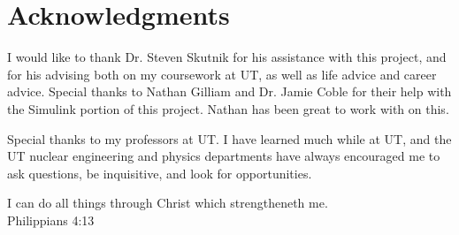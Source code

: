 \chapter*{Acknowledgments}
I would like to thank Dr. Steven Skutnik for his assistance with this project, and for his advising both on my coursework at UT, as well as life advice and career advice. Special thanks to Nathan Gilliam and Dr. Jamie Coble for their help with the Simulink portion of this project. Nathan has been great to work with on this. 

Special thanks to my professors at UT. I have learned much while at UT, and the UT nuclear engineering and physics departments have always encouraged me to ask questions, be inquisitive, and look for opportunities.


\pagebreak

\begin{centering}
\vspace{5cm}
I can do all things through Christ which strengtheneth me. \\
Philippians 4:13 \\
\end{centering}
